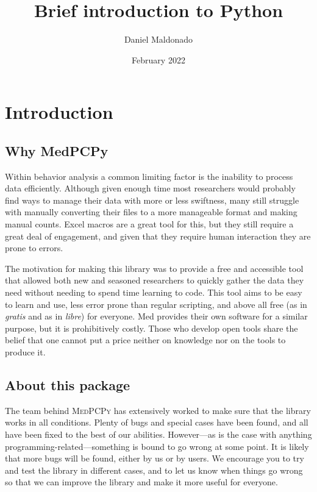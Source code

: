 \documentclass[a4paper,12pt]{article}
\title{Brief introduction to Python}
\author{Daniel Maldonado}
\date{February 2022}
\begin{document}
{\scshape\bfseries \maketitle}

\tableofcontents

\newpage
\section{Introduction}

\subsection{Why MedPCPy}

Within behavior analysis a common limiting factor is the inability to process data efficiently. Although given enough time most researchers would probably find ways to manage their data with more or less swiftness, many still struggle with manually converting their files to a more manageable format and making manual counts. Excel macros are a great tool for this, but they still require a great deal of engagement, and given that they require human interaction they are prone to errors.

The motivation for making this library was to provide a free and accessible tool that allowed both new and seasoned researchers to quickly gather the data they need without needing to spend time learning to code. This tool aims to be easy to learn and use, less error prone than regular scripting, and above all free (as in {\slshape gratis} and as in {\slshape libre}) for everyone. Med provides their own software for a similar purpose, but it is prohibitively costly. Those who develop open tools share the belief that one cannot put a price neither on knowledge nor on the tools to produce it.

\subsection{About this package}

The team behind {\scshape MedPCPy} has extensively worked to make sure that the library works in all conditions. Plenty of bugs and special cases have been found, and all have been fixed to the best of our abilities. However---as is the case with anything programming-related---something is bound to go wrong at some point. It is likely that more bugs will be found, either by us or by users. We encourage you to try and test the library in different cases, and to let us know when things go wrong so that we can improve the library and make it more useful for everyone.
\end{document}
